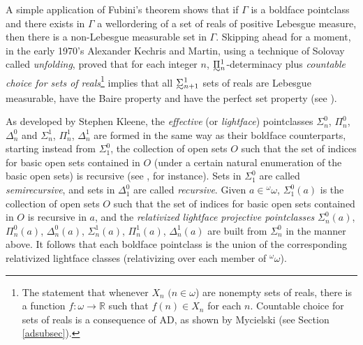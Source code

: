\documentclass{book}%
\newcommand{\breals}{{^{\omega}}\omega}
\def\underTilde#1{{\baselineskip=0pt\vtop{\hbox{$#1$}\hbox{$\sim$}}}{}}
\newcommand{\uTPi}{\underTilde{\Pi}}
\newcommand{\uTSigma}{\underTilde{\Sigma}}
\begin{document}
A simple application of Fubini's theorem shows that if $\Gamma$ is a boldface pointclass
and there exists in $\Gamma$ a wellordering of a set of reals of positive Lebesgue measure,
then there is a non-Lebesgue measurable set in $\Gamma$.
Skipping ahead for a moment, in the early 1970's
Alexander Kechris and Martin, using a technique of Solovay
called \emph{unfolding}, proved that for
each integer $n$, $\uTPi^{1}_{n}$-determinacy plus \emph{countable
choice for sets of reals}\footnote{The statement that whenever $X_{n}$ $(n
\in \omega$) are nonempty sets of reals, there is a function $f
\colon \omega \to \mathbb{R}$ such that $f(n) \in X_{n}$ for each
$n$. Countable choice for sets of reals is a consequence of AD,
as shown by Mycielski  (see Section \ref{adsubsec}).}
implies that all $\uTSigma^{1}_{n+1}$ sets of reals are
Lebesgue measurable, have the Baire property and have the perfect
set property (see \cite[pp.~380-381]{Kanamori}).






As developed by Stephen Kleene, the \emph{effective}
(or \emph{lightface}) pointclasses
$\Sigma^{0}_{n}$, $\Pi^{0}_{n}$, $\Delta^{0}_{n}$  and $\Sigma^{1}_{n}$,
$\Pi^{1}_{n}$, $\Delta^{1}_{n}$  are formed in the same way as their
boldface counterparts, starting instead from $\Sigma^{0}_{1}$, the
collection of open sets $O$ such that the set of indices for basic
open sets contained in $O$ (under a certain natural enumeration of the
basic open sets) is recursive (see \cite{Moschovakis:DST09}, for
instance). Sets in $\Sigma^{0}_{1}$ are called
\emph{semirecursive}, and sets in
$\Delta^{0}_{1}$ are called \emph{recursive}. Given $a \in \breals$, $\Sigma^{0}_{1}(a)$ is the
collection of open sets $O$ such that the set of indices for basic
open sets contained in $O$ is recursive in $a$, and the
\emph{relativized lightface projective pointclasses} $\Sigma^{0}_{n}(a)$, $\Pi^{0}_{n}(a)$,
$\Delta^{0}_{n}(a)$, $\Sigma^{1}_{n}(a)$, $\Pi^{1}_{n}(a)$,
$\Delta^{1}_{n}(a)$ are built from $\Sigma^{0}_{n}$ in the manner
above. It follows that each boldface pointclass is the union of the
corresponding relativized lightface classes (relativizing over each
member of $\breals$).
\end{document}

